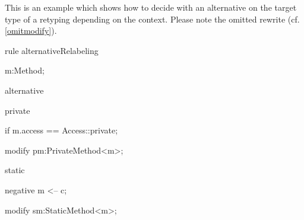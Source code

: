 \begin{example}
This is an example which shows how to decide with an alternative on the target type of a retyping depending on the context.
Please note the omitted rewrite (cf. \ref{omitmodify}).

  \begin{grgen}
rule alternativeRelabeling
{
  m:Method;
  
  alternative {
    private {
      if { m.access == Access::private; }

      modify {
        pm:PrivateMethod<m>;
      }
    }
    static {
      negative {
        m <-- c;
      }

      modify {
        sm:StaticMethod<m>;
      }
    }
  } 
}
  \end{grgen}
\end{example}
